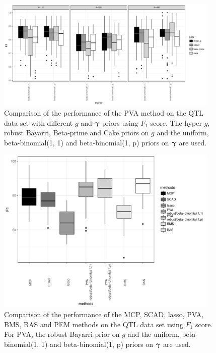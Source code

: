 \begin{figure}[h!]
	\begin{center}	
		\includegraphics[width=0.95\textwidth]{./qtlPVA_F1.pdf}  
	\end{center}
	\caption{Comparison of the performance of the PVA method on the
						QTL data set with different $g$ and ${\boldsymbol \gamma}$ priors using $F_1$ score.
						The hyper-$g$,
						robust Bayarri, Beta-prime and Cake priors on $g$ and the uniform, beta-binomial(1, 1) and beta-binomial(1, p) priors on ${\boldsymbol \gamma}$ are used.}
	\label{fig:qtlPVA_F1}
\end{figure}

\begin{figure}[h!]
	\begin{center}	
		\includegraphics[width=0.95\textwidth]{./qtlPVA_F1_compare.pdf}  
	\end{center}
	\caption{Comparison of the performance of the MCP, SCAD, lasso, PVA, BMS, BAS and PEM methods on the
						QTL data set using $F_1$ score. For PVA, the
						robust Bayarri prior on $g$ and the uniform, beta-binomial(1, 1) and beta-binomial(1, p) priors
						on ${\boldsymbol \gamma}$ are used.}
	\label{fig:qtlPVA_F1_compare}
\end{figure}


